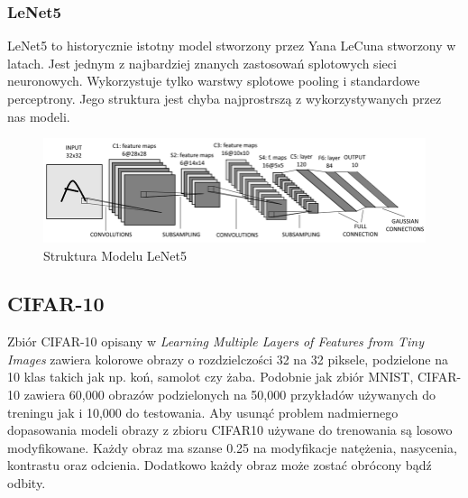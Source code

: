 \documentclass[
    left=2.5cm,         %
    right=2.5cm,        %
    top=2.5cm,          %
    bottom=3cm,         %
    bindingoffset=6mm,  %
    nohyphenation=false %
]{eiti/eiti-thesis}
\begin{document}
        \subsubsection{LeNet5}\label{LeNet5}
        LeNet5 to historycznie istotny model stworzony przez Yana LeCuna stworzony w latach.
        Jest jednym z najbardziej znanych zastosowań splotowych sieci neuronowych. Wykorzystuje tylko
        warstwy splotowe pooling i standardowe perceptrony. Jego struktura jest chyba najprostrszą z wykorzystywanych
        przez nas modeli.
       \begin{figure}[H]
           \centring
            \includegraphics[width=\textwidth]{eiti/lenet5_overview.png}
            \caption{Struktura Modelu LeNet5\cite{LeNet5Diagram}}
       \end{figure}

    \subsection{CIFAR-10}
    Zbiór CIFAR-10 opisany w \textit{Learning Multiple Layers of Features from Tiny Images} \cite{Krizhevsky2009LearningML} zawiera kolorowe obrazy o rozdzielczości 32 na 32 piksele,
    podzielone na 10 klas takich jak np. koń, samolot czy żaba. Podobnie jak zbiór MNIST, CIFAR-10 zawiera
    60,000 obrazów podzielonych na 50,000 przykładów używanych do treningu jak i 10,000 do testowania.
    Aby usunąć problem nadmiernego dopasowania modeli obrazy z zbioru CIFAR10 używane
    do trenowania są losowo modyfikowane. Każdy obraz ma szanse 0.25
    na modyfikacje natężenia, nasycenia, kontrastu oraz odcienia. Dodatkowo każdy obraz może zostać obrócony bądź odbity.

\end{document}
